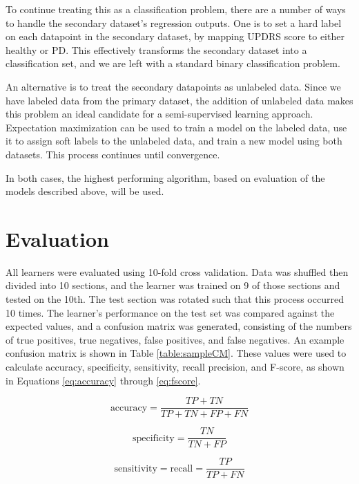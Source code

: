 \documentclass[draftcopy]{srpaper}
\begin{document}
To continue treating this as a classification problem, there are a
number of ways to handle the secondary dataset's regression
outputs. One is to set a hard label on each datapoint in the secondary
dataset, by mapping UPDRS score to either healthy or PD. This
effectively transforms the secondary dataset into a classification
set, and we are left with a standard binary classification problem.

An alternative is to treat the secondary datapoints as unlabeled
data. Since we have labeled data from the primary dataset, the
addition of unlabeled data makes this problem an ideal candidate for a
semi-supervised learning approach. Expectation maximization can be
used to train a model on the labeled data, use it to assign soft
labels to the unlabeled data, and train a new model using both
datasets. This process continues until convergence.

In both cases, the highest performing algorithm, based on evaluation
of the models described above, will be used.

\chapter{Evaluation}
\label{Chapter:Four}
All learners were evaluated using 10-fold cross validation. Data was
shuffled then 
divided into 10 sections, and the learner was trained on 9 of those
sections and tested on the 10th. The test section was rotated such
that this process occurred 10 times. The learner's performance on the
test set was compared against the expected values, and a confusion
matrix was generated, consisting of the numbers of true positives,
true negatives, false positives, and false negatives. An example
confusion matrix is shown in Table \ref{table:sampleCM}. These values
were used to calculate accuracy, specificity, sensitivity, recall precision, and F-score, as shown in Equations \ref{eq:accuracy}
through \ref{eq:fscore}.

\begin{equation}
\mbox{accuracy} = \frac{TP + TN}{TP + TN + FP + FN}
\label{eq:accuracy}
\end{equation}

\begin{equation}
\mbox{specificity} = \frac{TN}{TN + FP}
\label{eq:recall}
\end{equation}

\begin{equation}
\mbox{sensitivity} = \mbox{recall} = \frac{TP}{TP + FN}
\label{eq:recall}
\end{equation}
\end{document}
